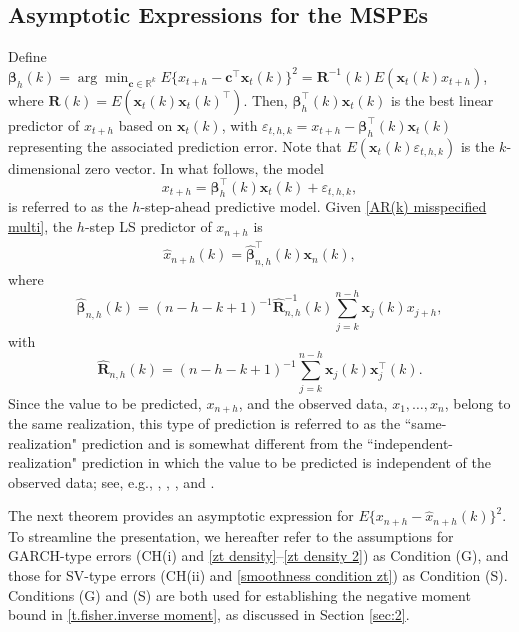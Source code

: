 \documentclass[ejsv2]{imsart}
\theoremstyle{plain}
\theoremstyle{definition}
\theoremstyle{remark}
\begin{document}
\subsection{Asymptotic Expressions for the MSPEs}\label{sec:3.1}
Define
$\bm{\beta}_h(k)=\arg\min_{\mathbf{c}\in\mathbb{R}^k}E\{x_{t+h}-\mathbf{c}^\top\mathbf{x}_{t}(k)\}^2=\mathbf{R}^{-1}(k)E(\mathbf{x}_t(k)x_{t+h})$, where $\mathbf{R}(k)=E(\mathbf{x}_t(k)\mathbf{x}_t(k)^\top)$.
Then, $\bm{\beta}_h^\top(k)\mathbf{x}_{t}(k)$
is the best linear predictor of $x_{t+h}$
based on $\mathbf{x}_{t}(k)$,
with $\varepsilon_{t,h,k}=x_{t+h}-\bm{\beta}_h^\top(k)\mathbf{x}_{t}(k)$ representing the associated 
prediction error. Note that 
$E(\mathbf{x}_{t}(k)\varepsilon_{t,h,k})$
is the $k$-dimensional zero vector.
In what follows, the model
\begin{equation}\label{AR(k) misspecified multi}
x_{t+h}=\bm{\beta}_h^\top(k)\mathbf{x}_{t}(k)+\varepsilon_{t,h,k},
\end{equation}
is referred to as the $h$-step-ahead predictive model. 
Given \eqref{AR(k) misspecified multi}, the $h$-step LS predictor of $x_{n+h}$ 
is 
\begin{eqnarray}
\label{ing1}
\hat{x}_{n+h}(k)=\hat{\bm{\beta}}_{n,h}^\top(k)\mathbf{x}_n(k),
\end{eqnarray}
where
$$\hat{\bm{\beta}}_{n,h}(k)=(n-h-k+1)^{-1}\hat{\mathbf{R}}^{-1}_{n,h}(k)\sum_{j=k}^{n-h}\mathbf{x}_j(k)x_{j+h},$$
with
$$\hat{\mathbf{R}}_{n,h}(k)=(n-h-k+1)^{-1}\sum_{j=k}^{n-h}\mathbf{x}_j(k)\mathbf{x}^\top_j(k).$$
Since the value to be predicted, $x_{n+h}$, and the observed data, $x_1, \ldots, x_n$,
belong to the same realization, this type of prediction is referred to as the
``same-realization" prediction and is somewhat different from the ``independent-realization" prediction
in which the value to be predicted is independent of the observed data; see, e.g.,
\cite{Akaike69},
\cite{Bhansali1981},
\cite{Findley2002}, and
\cite{Scho2005}.

The next theorem provides
an asymptotic expression for $E\{x_{n+h}-\hat{x}_{n+h}(k)\}^2$. To streamline the presentation, we hereafter refer to the assumptions for GARCH-type errors (CH(i) and \eqref{zt density}--\eqref{zt density 2}) as Condition (G), and those for SV-type errors (CH(ii) and \eqref{smoothness condition zt}) as Condition (S). Conditions (G) and (S) are both used for establishing the negative moment bound in \eqref{t.fisher.inverse moment}, as discussed in Section \ref{sec:2}.
\end{document}
